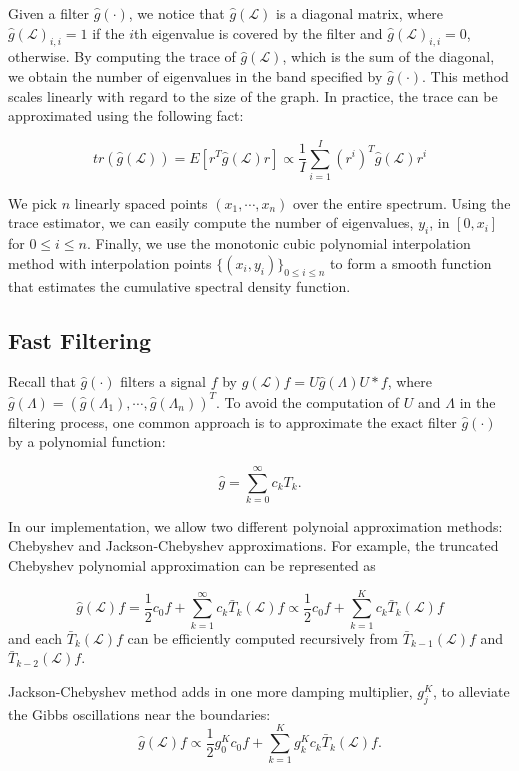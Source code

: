 \documentclass[a4paper]{article}
\renewcommand{\L}{\boldsymbol{\mathcal{L}}}
\theoremstyle{definition}
\begin{document}
Given a filter $\hat{g}(\cdot)$, we notice that $\hat{g}(\L)$ is a diagonal matrix, where $\hat{g}(\L)_{i,i} = 1$ if the $i$th eigenvalue is covered by the filter and $\hat{g}(\L)_{i,i} = 0$, otherwise. By computing the trace of $\hat{g}(\L)$, which is the sum of the diagonal, we obtain the number of eigenvalues in the band specified by $\hat{g}(\cdot)$. This method scales linearly with regard to the size of the graph. In practice, the trace can be approximated using the following fact:

$$tr(\hat{g}(\L)) = E[r^T\hat{g}(\L)r] \propto \frac{1}{I}\sum_{i =1}^{I} (r^{i})^T\hat{g}(\L)r^{i}$$

We pick $n$ linearly spaced points $(x_1, \cdots, x_n)$ over the entire spectrum. Using the trace estimator, we can easily compute the number of eigenvalues, $y_i$, in $[0, x_i]$ for $0\leq i \leq n$. Finally, we use the monotonic cubic polynomial interpolation method with interpolation points $\{(x_i, y_i)\}_{0\leq i \leq n}$ to form a smooth function that estimates the cumulative spectral density function.


\subsection{Fast Filtering}

Recall that $\hat{g}(\cdot)$ filters a signal $f$ by $\hat{g}(\L) f = U\hat{g}(\Lambda)U*f$, where $\hat{g}(\Lambda) = (\hat{g}(\Lambda_1), \cdots, \hat{g}(\Lambda_n))^T.$  To avoid the computation of $U$ and $\Lambda$ in the filtering process, one common approach is to approximate the exact filter $\hat{g}(\cdot)$ by a polynomial function:

$$\hat{g} = \sum_{k = 0}^{\infty} c_kT_k.$$

In our implementation, we allow two different polynoial approximation methods: Chebyshev and Jackson-Chebyshev approximations. For example, the truncated Chebyshev polynomial approximation can be represented as 

$$\hat{g}(\L)f = \frac{1}{2}c_0f + \sum_{k=1}^{\infty} c_k \bar{T}_k(\L)f \propto \frac{1}{2}c_0f + \sum_{k=1}^{K} c_k \bar{T}_k(\L)f$$ and each $\bar{T}_k(\L)f$ can be efficiently computed recursively from $\bar{T}_{k-1}(\L)f$ and $\bar{T}_{k-2}(\L)f$. 

Jackson-Chebyshev method adds in one more damping multiplier, $g_j^K$, to alleviate the Gibbs oscillations near the boundaries:
$$\hat{g}(\L)f \propto \frac{1}{2}g_0^Kc_0f + \sum_{k=1}^{K} g_k^Kc_k \bar{T}_k(\L)f.$$
\end{document}
